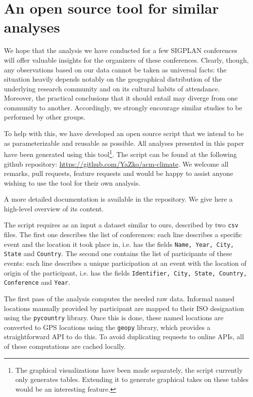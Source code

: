 \section{An open source tool for similar analyses}
\label{sec:software}

We hope that the analysis we have conducted for a few SIGPLAN conferences
will offer valuable insights for the organizers of these conferences.
Clearly, though, any observations based on our data cannot be taken as
universal facts: the situation heavily depends notably on the geographical
distribution of the underlying research community and on its cultural habits
of attendance. Moreover, the practical conclusions that it should entail may
diverge from one community to another.  Accordingly, we strongly encourage
similar studies to be performed by other groups.

To help with this, we have developed an open source \python{} script that we
intend to be as parameterizable and reusable as possible. All analyses
presented in 
this paper have been generated using this tool\footnote{The graphical
  visualizations have been made separately, the script currently only generates
  tables. Extending it to generate graphical takes on these tables would be an
  interesting feature.}. The script can be found at the following github repository:
\url{https://github.com/YaZko/acm-climate}.
We welcome all remarks, pull requests, feature requests and would be happy to assist
anyone wishing to use the tool for their own analysis.

A more detailed documentation is available in the repository. We give here a high-level overview
of its content.

The script requires as an input a dataset similar to ours, described by two
\texttt{csv} files. The first one describes the list of conferences: each line
describes a specific event and the location it took place in, i.e. has the
fields \texttt{Name, Year, City, State} and \texttt{Country}. The second one
contains the list of participants of these events: each line describes a unique
participation at an event with the location of origin of the participant, i.e.
has the fields \texttt{Identifier, City, State, Country, Conference} and
\texttt{Year}.

The first pass of the analysis computes the needed raw data.  Informal named
locations manually provided by participant are mapped to their ISO
designation using the \texttt{pycountry} library.  Once this is done, these
named locations are converted to GPS locations using the \texttt{geopy}
library, which provides a straightforward API to do this.  To avoid
duplicating requests to online APIs, all of these computations are cached
locally.

